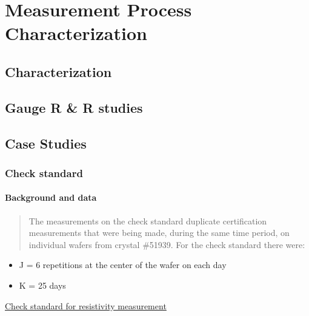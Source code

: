 \documentclass[]{book}
\providecommand{\tightlist}{%
  \setlength{\itemsep}{0pt}\setlength{\parskip}{0pt}}
\theoremstyle{definition}
\theoremstyle{definition}
\theoremstyle{definition}
\theoremstyle{remark}
\begin{document}
\hypertarget{measurement-process-characterization}{%
\chapter{Measurement Process
Characterization}\label{measurement-process-characterization}}

\hypertarget{characterization}{%
\section{Characterization}\label{characterization}}

\hypertarget{gauge-r-r-studies}{%
\section{Gauge R \& R studies}\label{gauge-r-r-studies}}

\hypertarget{case-studies}{%
\section{Case Studies}\label{case-studies}}

\hypertarget{check-standard}{%
\subsection{Check standard}\label{check-standard}}

\hypertarget{background-and-data}{%
\subsubsection{Background and data}\label{background-and-data}}

\begin{quote}
The measurements on the check standard duplicate certification
measurements that were being made, during the same time period, on
individual wafers from crystal \#51939. For the check standard there
were:
\end{quote}

\begin{itemize}
\tightlist
\item
  J = 6 repetitions at the center of the wafer on each day
\item
  K = 25 days
\end{itemize}

\href{https://www.itl.nist.gov/div898/handbook/mpc/section6/mpc62.htm}{Check
standard for resistivity measurement}
\end{document}
